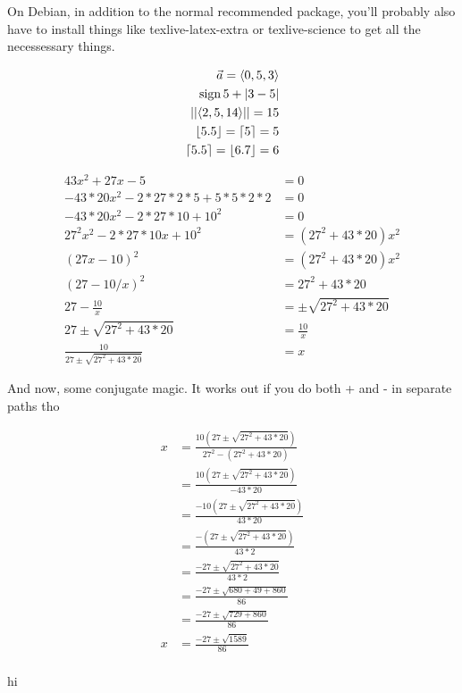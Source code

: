 \documentclass{article}
\DeclareMathOperator{\sgn}{sign}
\DeclarePairedDelimiter\abs{\lvert}{\rvert}
\DeclarePairedDelimiter\magn{\lvert\lvert}{\rvert\rvert}
\DeclarePairedDelimiter\ceil{\lceil}{\rceil}
\DeclarePairedDelimiter\floor{\lfloor}{\rfloor}
\DeclarePairedDelimiter\vecnum{\langle}{\rangle}
\begin{document}
On Debian, in addition to the normal recommended package, you'll probably also have to install things like texlive-latex-extra or texlive-science to get all the necessessary things.

\begin{align*}
  \vec a=\vecnum{0,5,3}\\
  \sgn 5+\abs{3-5}\\
  \magn{\vecnum{2,5,14}}=15\\
  \floor{5.5}=\ceil{5}=5\\
  \ceil{5.5}=\floor{6.7}=6
\end{align*}

\begin{align*}
43x^2+27x-5&=0\\
-43*20x^2-2*27*2*5+5*5*2*2&=0\\
-43*20x^2-2*27*10+10^2&=0\\
27^2x^2-2*27*10x+10^2&=(27^2+43*20)x^2\\
(27x-10)^2&=(27^2+43*20)x^2\\
(27-10/x)^2&=27^2+43*20\\
27-\frac{10}x&=\pm\sqrt{27^2+43*20}\\
27\pm\sqrt{27^2+43*20}&=\frac{10}x\\
\frac{10}{27\pm\sqrt{27^2+43*20}}&=x
\end{align*}

And now, some conjugate magic.  It works out if you do both + and - in separate paths tho

\begin{align*}
x&=\frac{10(27\pm\sqrt{27^2+43*20})}{27^2-(27^2+43*20)}\\
&=\frac{10(27\pm\sqrt{27^2+43*20})}{-43*20}\\
&=\frac{-10(27\pm\sqrt{27^2+43*20})}{43*20}\\
&=\frac{-(27\pm\sqrt{27^2+43*20})}{43*2}\\
&=\frac{-27\pm\sqrt{27^2+43*20}}{43*2}\\
&=\frac{-27\pm\sqrt{680+49+860}}{86}\\
&=\frac{-27\pm\sqrt{729+860}}{86}\\
x&=\frac{-27\pm\sqrt{1589}}{86}\\
\end{align*}

\begin{stonk}
hi
\end{stonk}
\end{document}
